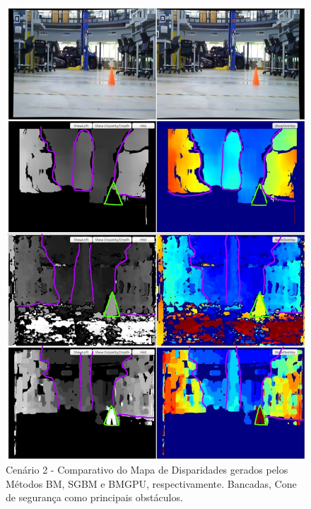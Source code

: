 \begin{figure}[H]
 	\centering
 	\includegraphics[scale=0.35]{./Resources/results/scene2_montage_highlighted.jpg}
 	\caption{Cenário 2 - Comparativo do Mapa de Disparidades gerados pelos Métodos BM, SGBM e BMGPU, respectivamente. Bancadas, Cone de segurança como principais obstáculos.}
 	\label{scene2_montage}
\end{figure}

